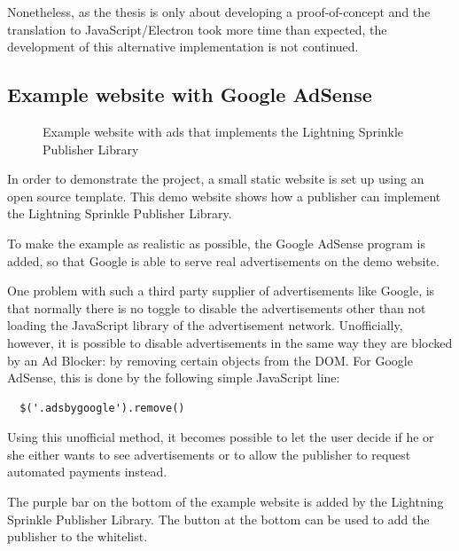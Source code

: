Nonetheless, as the thesis is only about developing a proof-of-concept and the translation to JavaScript/Electron took more time than expected, the development of this alternative implementation is not continued.

\subsection{Example website with Google AdSense}
\label{sec:examplesite}

\begin{figure}[h!]
  \setlength{\fboxsep}{0pt}%
  \caption{Example website with ads that implements the Lightning Sprinkle Publisher Library}
\end{figure}

In order to demonstrate the project, a small static website is set up using an open source template. This demo website shows how a publisher can implement the Lightning Sprinkle Publisher Library. 

To make the example as realistic as possible, the Google AdSense program is added, so that Google is able to serve real advertisements on the demo website. 

One problem with such a third party supplier of advertisements like Google, is that normally there is no toggle to disable the advertisements other than not loading the JavaScript library of the advertisement network. Unofficially, however, it is possible to disable advertisements in the same way they are blocked by an Ad Blocker: by removing certain objects from the DOM. For Google AdSense, this is done by the following simple JavaScript line:


\lstset{language=JavaScript}
\lstset{frame=lines}
\lstset{basicstyle=\footnotesize}
\begin{lstlisting}
  $('.adsbygoogle').remove()
\end{lstlisting}

Using this unofficial method, it becomes possible to let the user decide if he or she either wants to see advertisements or to allow the publisher to request automated payments instead.

The purple bar on the bottom of the example website is added by the Lightning Sprinkle Publisher Library. The button at the bottom can be used to add the publisher to the whitelist.
